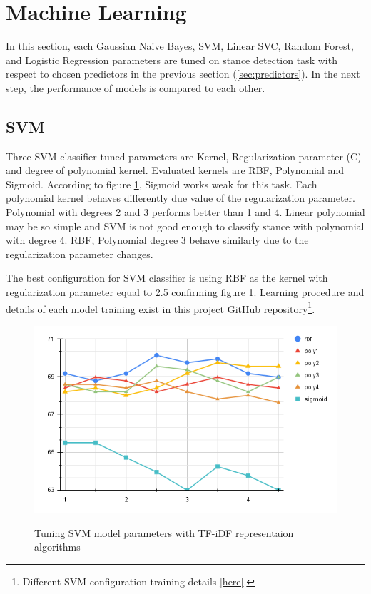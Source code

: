 \section{Machine Learning}
\label{sec:ml}
In this section, each Gaussian Naive Bayes, SVM, Linear SVC, Random Forest, and Logistic Regression parameters are tuned on stance detection task with respect to chosen predictors in the previous section (\ref{sec:predictors}). In the next step, the performance of models is compared to each other.

\subsection{SVM}
Three SVM classifier tuned parameters  are Kernel, Regularization parameter (C) and degree of polynomial kernel. Evaluated kernels are RBF, Polynomial and Sigmoid. According to figure \ref{fig:svm}, Sigmoid works weak for this task. Each polynomial kernel behaves differently due value of the regularization parameter. Polynomial with degrees 2 and 3 performs better than 1 and 4. Linear polynomial may be so simple and SVM is not good enough to classify stance with polynomial with degree 4. RBF, Polynomial degree 3 behave similarly due to the regularization parameter changes. 

The best configuration for SVM classifier is using RBF as the kernel with regularization parameter equal to 2.5 confirming figure \ref{fig:svm}. Learning procedure and details of each model training exist in this project GitHub repository\footnote{Different SVM configuration training details \href{https://github.com/mahsaghn/stance\_detection/tree/main/selected\_outputs/machinelearning/svm}{[here]}.}.

\begin{figure}%
	\centering
	{\includegraphics[width=12.5cm]{statistics/svm.png} }
	\caption{Tuning SVM model parameters with TF-iDF representaion algorithms}%
	\label{fig:svm}%
\end{figure}

